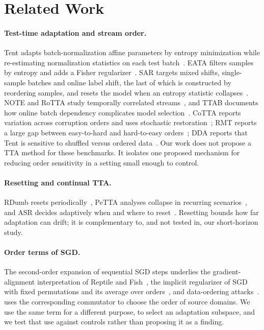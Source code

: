 \section{Related Work}
\label{sec:related}

\paragraph{Test-time adaptation and stream order.} Tent adapts batch-normalization affine parameters by
entropy minimization while re-estimating normalization statistics on each test batch~\citep{wang2021tent}.
EATA filters samples by entropy and adds a Fisher regularizer~\citep{niu2022eata}. SAR targets mixed shifts,
single-sample batches and online label shift, the last of which is constructed by reordering samples, and
resets the model when an entropy statistic collapses~\citep{niu2023sar}. NOTE and RoTTA study temporally
correlated streams~\citep{gong2022note,yuan2023rotta}, and TTAB documents how online batch dependency
complicates model selection~\citep{zhao2023pitfalls}. CoTTA reports variation across corruption orders and
uses stochastic restoration~\citep{wang2022cotta}; RMT reports a large gap between easy-to-hard and
hard-to-easy orders~\citep{dobler2023rmt}; DDA reports that Tent is sensitive to shuffled versus ordered
data~\citep{gao2023dda}. Our work does not propose a TTA method for these benchmarks. It isolates one
proposed mechanism for reducing order sensitivity in a setting small enough to control.

\paragraph{Resetting and continual TTA.} RDumb resets periodically~\citep{press2023rdumb}, PeTTA analyses
collapse in recurring scenarios~\citep{hoang2024petta}, and ASR decides adaptively when and where to
reset~\citep{lim2026asr}. Resetting bounds how far adaptation can drift; it is complementary to, and not
tested in, our short-horizon study.

\paragraph{Order terms of SGD.} The second-order expansion of sequential SGD steps underlies the
gradient-alignment interpretation of Reptile and Fish~\citep{nichol2018reptile,shi2022fish}, the implicit
regularizer of SGD with fixed permutations and its average over orders~\citep{smith2021origin}, and
data-ordering attacks~\citep{shumailov2021ordering}. \citet{sweeney2026lie} uses the corresponding
commutator to choose the order of source domains. We use the same term for a different purpose, to select an
adaptation subspace, and we test that use against controls rather than proposing it as a finding.


